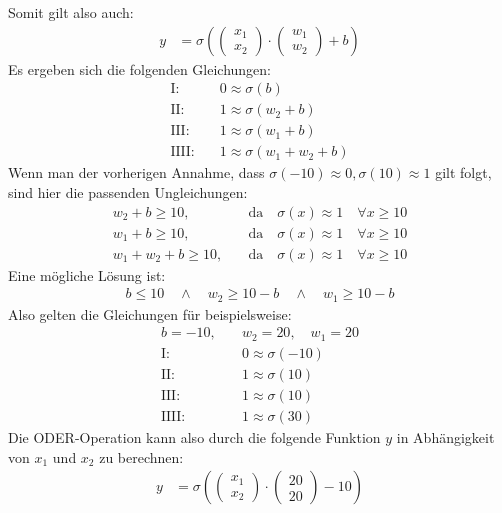Somit gilt also auch:
\begin{align}
    y&=\sigma\left(\begin{pmatrix}
        x_1 \\
        x_2
    \end{pmatrix}\cdot
    \begin{pmatrix}
        w_1 \\
        w_2
    \end{pmatrix}+b\right)
\end{align}
Es ergeben sich die folgenden Gleichungen:
\begin{align}
    \text{I:}&\quad 0\approx\sigma(b) \\
    \text{II:}&\quad 1\approx\sigma(w_2+b) \\
    \text{III:}&\quad 1\approx\sigma(w_1+b) \\
    \text{IIII:}&\quad 1\approx\sigma(w_1+w_2+b)
\end{align}
Wenn man der vorherigen Annahme, dass $\sigma(-10)\approx 0,\sigma(10)\approx 1$ gilt folgt, sind hier die passenden Ungleichungen:
\begin{align}
    w_2+b\geq 10,&\quad\text{da}\quad\sigma(x)\approx 1\quad\forall x\geq 10 \\
    w_1+b\geq 10,&\quad\text{da}\quad\sigma(x)\approx 1\quad\forall x\geq 10 \\
    w_1+w_2+b\geq10,&\quad\text{da}\quad\sigma(x)\approx 1\quad\forall x\geq 10
\end{align}
Eine mögliche Lösung ist:
\begin{align}
    b\leq 10 \quad\land\quad w_2\geq 10-b \quad\land\quad w_1\geq 10-b
\end{align}
Also gelten die Gleichungen für beispielsweise:
\begin{align}
    b=-10,&\quad w_2=20,\quad w_1=20 \\
    \text{I:}&\quad 0\approx\sigma(-10) \\
    \text{II:}&\quad 1\approx\sigma(10) \\
    \text{III:}&\quad 1\approx\sigma(10) \\
    \text{IIII:}&\quad 1\approx\sigma(30)
\end{align}
Die ODER-Operation kann also durch die folgende Funktion $y$ in Abhängigkeit von $x_1$ und $x_2$ zu berechnen:
\begin{align}
    y&=\sigma\left(\begin{pmatrix}
        x_1 \\
        x_2
    \end{pmatrix}\cdot
    \begin{pmatrix}
        20 \\
        20
    \end{pmatrix}-10\right)
\end{align}
